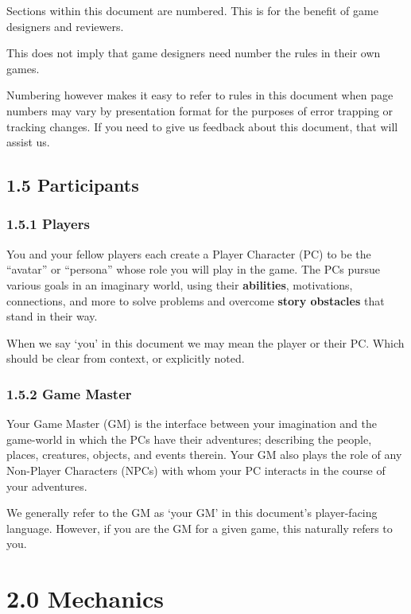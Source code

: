 \documentclass[
]{article}
\begin{document}
Sections within this document are numbered. This is for the benefit of
game designers and reviewers.

This does not imply that game designers need number the rules in their
own games.

Numbering however makes it easy to refer to rules in this document when
page numbers may vary by presentation format for the purposes of error
trapping or tracking changes. If you need to give us feedback about this
document, that will assist us.

\hypertarget{participants}{%
\subsection{1.5 Participants}\label{participants}}

\hypertarget{players}{%
\subsubsection{1.5.1 Players}\label{players}}

You and your fellow players each create a Player Character (PC) to be
the ``avatar'' or ``persona'' whose role you will play in the game. The
PCs pursue various goals in an imaginary world, using their
\textbf{abilities}, motivations, connections, and more to solve problems
and overcome \textbf{story obstacles} that stand in their way.

When we say `you' in this document we may mean the player or their PC.
Which should be clear from context, or explicitly noted.

\hypertarget{game-master}{%
\subsubsection{1.5.2 Game Master}\label{game-master}}

Your Game Master (GM) is the interface between your imagination and the
game-world in which the PCs have their adventures; describing the
people, places, creatures, objects, and events therein. Your GM also
plays the role of any Non-Player Characters (NPCs) with whom your PC
interacts in the course of your adventures.

We generally refer to the GM as `your GM' in this document's
player-facing language. However, if you are the GM for a given game,
this naturally refers to you.

\hypertarget{mechanics}{%
\section{2.0 Mechanics}\label{mechanics}}
\end{document}
